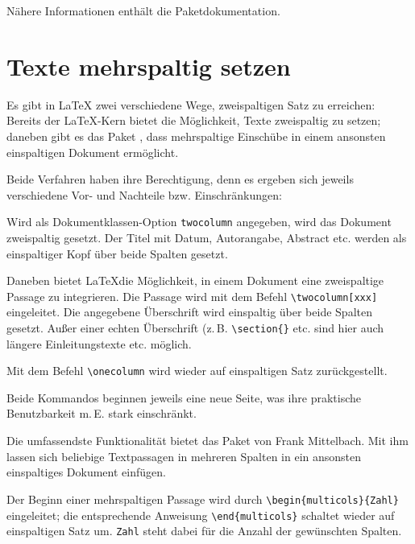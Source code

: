 Nähere Informationen enthält die Paketdokumentation.


\section{Texte mehrspaltig setzen}

Es gibt in \LaTeX{} zwei verschiedene Wege, zweispaltigen Satz zu erreichen:
Bereits der \LaTeX -Kern bietet die Möglichkeit, Texte zweispaltig zu setzen;
daneben gibt es das Paket , dass mehrspaltige Einschübe in einem ansonsten
einspaltigen Dokument ermöglicht.

Beide Verfahren haben ihre Berechtigung, denn es ergeben sich jeweils verschiedene
Vor- und Nachteile bzw. Einschränkungen:


Wird als Dokumentklassen-Option \lstinline/twocolumn/ angegeben, wird das Dokument 
zweispaltig gesetzt. 
Der Titel mit Datum, Autorangabe, Abstract etc. werden als einspaltiger Kopf über beide 
Spalten gesetzt.



Daneben bietet \LaTeX die Möglichkeit, in einem Dokument eine zweispaltige Passage
zu integrieren. Die Passage wird mit dem Befehl \lstinline/\twocolumn[xxx] /
eingeleitet. Die angegebene Überschrift wird einspaltig über beide Spalten gesetzt.
Außer einer echten Überschrift (z.\,B. \lstinline/\section{}/ etc. sind hier auch
längere Einleitungstexte etc. möglich.

Mit dem Befehl \lstinline/\onecolumn/ wird wieder auf einspaltigen Satz zurückgestellt.

Beide Kommandos beginnen jeweils eine neue Seite, was ihre praktische Benutzbarkeit m.\,E.
stark einschränkt.



\begin{multicols}{2}
 Die umfassendste Funktionalität bietet das Paket  von Frank Mittelbach.
 Mit ihm lassen sich beliebige Textpassagen in mehreren Spalten in ein ansonsten
 einspaltiges Dokument einfügen.
 
 Der Beginn einer mehrspaltigen Passage wird durch \lstinline/\begin{multicols}{Zahl}/ 
 eingeleitet; die entsprechende Anweisung \lstinline/\end{multicols}/ schaltet wieder
 auf einspaltigen Satz um. \lstinline/Zahl/ steht dabei für die Anzahl der gewünschten 
 Spalten.                                            
\end{multicols}

